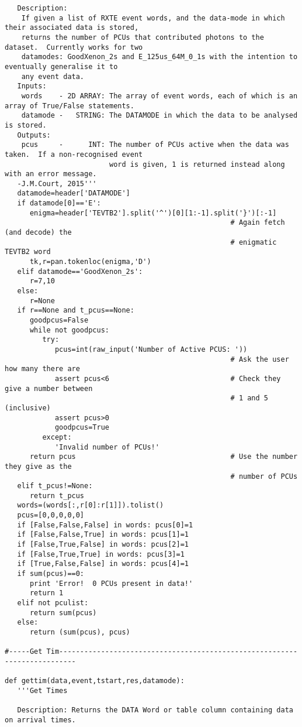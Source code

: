 \begin{verbatim}
   Description:
    If given a list of RXTE event words, and the data-mode in which their associated data is stored,
    returns the number of PCUs that contributed photons to the dataset.  Currently works for two
    datamodes: GoodXenon_2s and E_125us_64M_0_1s with the intention to eventually generalise it to
    any event data.
   Inputs:
    words    - 2D ARRAY: The array of event words, each of which is an array of True/False statements.
    datamode -   STRING: The DATAMODE in which the data to be analysed is stored.
   Outputs:
    pcus     -      INT: The number of PCUs active when the data was taken.  If a non-recognised event
                         word is given, 1 is returned instead along with an error message.
   -J.M.Court, 2015'''
   datamode=header['DATAMODE']
   if datamode[0]=='E':
      enigma=header['TEVTB2'].split('^')[0][1:-1].split('}')[:-1]
                                                      # Again fetch (and decode) the
                                                      # enigmatic TEVTB2 word
      tk,r=pan.tokenloc(enigma,'D')
   elif datamode=='GoodXenon_2s':
      r=7,10
   else:
      r=None
   if r==None and t_pcus==None:
      goodpcus=False
      while not goodpcus:
         try:
            pcus=int(raw_input('Number of Active PCUS: '))
                                                      # Ask the user how many there are
            assert pcus<6                             # Check they give a number between 
                                                      # 1 and 5 (inclusive)
            assert pcus>0
            goodpcus=True
         except:
            'Invalid number of PCUs!'
      return pcus                                     # Use the number they give as the
                                                      # number of PCUs
   elif t_pcus!=None:
      return t_pcus
   words=(words[:,r[0]:r[1]]).tolist()
   pcus=[0,0,0,0,0]
   if [False,False,False] in words: pcus[0]=1
   if [False,False,True] in words: pcus[1]=1
   if [False,True,False] in words: pcus[2]=1
   if [False,True,True] in words: pcus[3]=1
   if [True,False,False] in words: pcus[4]=1
   if sum(pcus)==0:
      print 'Error!  0 PCUs present in data!'
      return 1
   elif not pculist:
      return sum(pcus)
   else:
      return (sum(pcus), pcus)

#-----Get Tim--------------------------------------------------------------------------

def gettim(data,event,tstart,res,datamode):
   '''Get Times
   
   Description: Returns the DATA Word or table column containing data on arrival times.
   

\end{verbatim}
